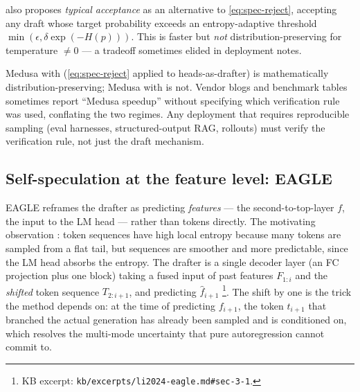 \citet[\S 2.3.1]{cai2024-medusa} also proposes \emph{typical
acceptance} as an alternative to \cref{eq:spec-reject}, accepting any
draft whose target probability exceeds an entropy-adaptive threshold
$\min(\epsilon, \delta \exp(-H(p)))$. This is faster but \emph{not}
distribution-preserving for temperature $\neq 0$ --- a tradeoff
sometimes elided in deployment notes.

\begin{contradiction}
Medusa with  (\cref{eq:spec-reject} applied to
heads-as-drafter) is mathematically distribution-preserving; Medusa
with  is not. Vendor blogs and benchmark tables
sometimes report ``Medusa speedup'' without specifying which
verification rule was used, conflating the two regimes. Any deployment
that requires reproducible sampling (eval harnesses, structured-output
RAG,  rollouts) must verify the verification rule, not just the
draft mechanism.
\end{contradiction}

\subsection{Self-speculation at the feature level: EAGLE}
\label{sec:mt-eagle}

EAGLE \citep{li2024-eagle} reframes the drafter as predicting
\emph{features} --- the second-to-top-layer  $f$, the
input to the LM head --- rather than tokens directly. The motivating
observation \citep[abstract]{li2024-eagle}: token sequences have high
local entropy because many tokens are sampled from a flat tail, but
 sequences are smoother and more predictable, since the LM head
absorbs the entropy. The drafter is a single decoder layer (an FC
projection plus one  block) taking a fused input of past
features $F_{1:i}$ and the \emph{shifted} token sequence $T_{2:i+1}$,
and predicting $\hat f_{i+1}$ \citep[\S 3.1]{li2024-eagle}\footnote{KB
excerpt: \nolinkurl{kb/excerpts/li2024-eagle.md#sec-3-1}.}. The shift by
one is the trick the method depends on: at the time of predicting $f_{i+1}$,
the token $t_{i+1}$ that branched the actual generation has already
been sampled and is conditioned on, which resolves the multi-mode
uncertainty that pure  autoregression cannot commit to.

